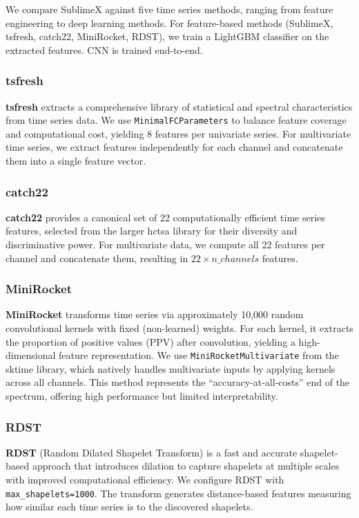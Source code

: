 \documentclass[times, review, 10pt]{elsarticle}
\begin{document}
We compare SublimeX against five time series methods, ranging from feature engineering to deep learning methods.
For feature-based methods (SublimeX, tsfresh, catch22, MiniRocket, RDST), we train a LightGBM classifier on the extracted features. CNN is trained end-to-end.

\subsubsection{tsfresh}
\textbf{tsfresh} \cite{christ2018tsfresh} extracts a comprehensive library of statistical and spectral characteristics from time series data.
We use \texttt{MinimalFCParameters} to balance feature coverage and computational cost, yielding 8 features per univariate series.
For multivariate time series, we extract features independently for each channel and concatenate them into a single feature vector.

\subsubsection{catch22}
\textbf{catch22} \cite{lubba2019catch22} provides a canonical set of 22 computationally efficient time series features, selected from the larger hctsa
library for their diversity and discriminative power.
For multivariate data, we compute all 22 features per channel and concatenate them, resulting in $22 \times n\_channels$ features.

\subsubsection{MiniRocket}
\textbf{MiniRocket} \cite{dempster2021minirocket} transforms time series via approximately 10,000 random convolutional kernels with fixed (non-learned) weights.
For each kernel, it extracts the proportion of positive values (PPV) after convolution, yielding a high-dimensional feature representation.
We use \texttt{MiniRocketMultivariate} from the sktime library, which natively handles multivariate inputs by applying kernels across all channels.
This method represents the ``accuracy-at-all-costs'' end of the spectrum, offering high performance but limited interpretability.

\subsubsection{RDST}
\textbf{RDST} \cite{guillaume2022random} (Random Dilated Shapelet Transform) is a fast and accurate shapelet-based approach that introduces dilation to capture 
shapelets at multiple scales with improved computational efficiency.
We configure RDST with \texttt{max\_shapelets=1000}. The transform generates distance-based features measuring how similar each time series is to the discovered shapelets.
\end{document}
